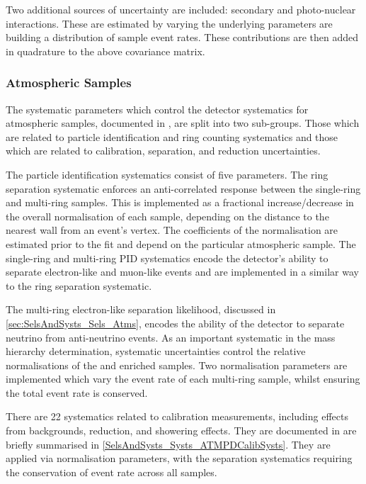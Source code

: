 Two additional sources of uncertainty are included: secondary and photo-nuclear interactions. These are estimated by varying the underlying parameters are building a distribution of sample event rates. These contributions are then added in quadrature to the above covariance matrix.

\subsubsection{Atmospheric Samples}
\label{sec:SelsAndSysts_Systs_FDAtm}

The systematic parameters which control the detector systematics for atmospheric samples, documented in \cite{Jiang2019-iw}, are split into two sub-groups. Those which are related to particle identification and ring counting systematics and those which are related to calibration, separation, and reduction uncertainties.

The particle identification systematics consist of five parameters. The ring separation systematic enforces an anti-correlated response between the single-ring and multi-ring samples. This is implemented as a fractional increase/decrease in the overall normalisation of each sample, depending on the distance to the nearest wall from an event's vertex. The coefficients of the normalisation are estimated prior to the fit and depend on the particular atmospheric sample. The single-ring and multi-ring PID systematics encode the detector's ability to separate electron-like and muon-like events and are implemented in a similar way to the ring separation systematic.

The multi-ring electron-like separation likelihood, discussed in \autoref{sec:SelsAndSysts_Sels_Atms}, encodes the ability of the detector to separate neutrino from anti-neutrino events. As an important systematic in the mass hierarchy determination, systematic uncertainties control the relative normalisations of the  and  enriched samples. Two normalisation parameters are implemented which vary the event rate of each multi-ring sample, whilst ensuring the total event rate is conserved. 

There are 22 systematics related to calibration measurements, including effects from backgrounds, reduction, and showering effects. They are documented in \cite{Jiang2019-iw} are briefly summarised in \autoref{SelsAndSysts_Systs_ATMPDCalibSysts}. They are applied via normalisation parameters, with the separation systematics requiring the conservation of event rate across all samples.

